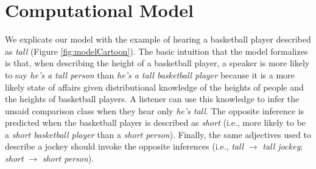 \documentclass[doc]{apa6}
\begin{document}


%

\section{Computational Model}

We explicate our model with the example of hearing a basketball player described as \emph{tall} (Figure \ref{fig:modelCartoon}). 
The basic intuition that the model formalizes is that, when describing the height of a basketball player, a speaker is more likely to say \emph{he's a tall person} than \emph{he's a tall basketball player} because it is a more likely state of affairs given distributional knowledge of the heights of people and the heights of basketball players. 
A listener can use this knowledge to infer the unsaid comparison class when they hear only \emph{he's tall}.
The opposite inference is predicted when the basketball player is described as \emph{short} (i.e., more likely to be a \emph{short basketball player} than a \emph{short person}).
Finally, the same adjectives used to describe a jockey should invoke the opposite inferences (i.e., \emph{tall} $\rightarrow$ \emph{tall jockey}; \emph{short} $\rightarrow$ \emph{short person}).
\end{document}
